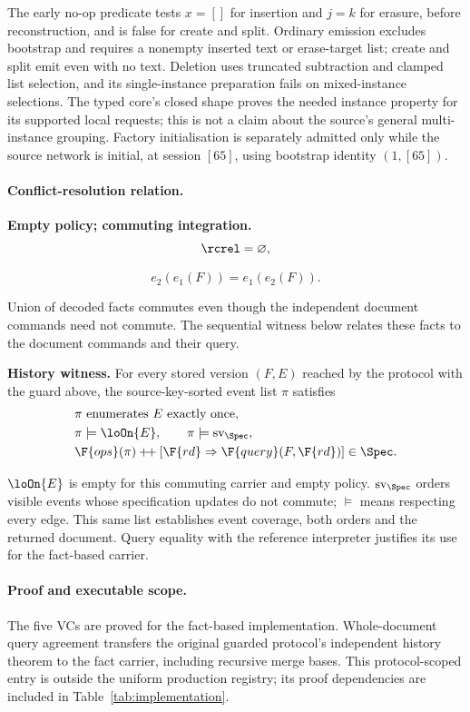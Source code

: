 The early no-op predicate tests $x=[]$ for insertion and $j=k$ for
erasure, before reconstruction, and is false for create and split.
Ordinary emission excludes bootstrap and requires a nonempty inserted
text or erase-target list; create and split emit even with no text.
Deletion uses truncated subtraction and clamped list selection, and its
single-instance preparation fails on mixed-instance selections. The typed
core's closed shape proves the needed instance property for its supported
local requests; this is not a claim about the source's general
multi-instance grouping. Factory initialisation is separately admitted
only while the source network is initial, at session $[65]$, using
bootstrap identity $(1,[65])$.

\paragraph{Conflict-resolution relation.}
\textbf{Empty policy; commuting integration.}
\[
\rcrel=\varnothing,
\]

\[
e_2(e_1(F))=e_1(e_2(F)).
\]

Union of decoded facts commutes even though the independent document commands
need not commute. The sequential witness below relates these facts to the
document commands and their query.

\textbf{History witness.} For every stored version $(F,E)$ reached by the
protocol with the guard above, the source-key-sorted event list $\pi$ satisfies
\[
\begin{aligned}
&\pi\text{ enumerates }E\text{ exactly once},\\
&\pi\models\loOn{E},\qquad\pi\models\operatorname{sv}_{\Spec},\\
&\F{ops}(\pi)\mathbin{+\!+}[\F{rd}\Rightarrow\F{query}(F,\F{rd})]\in\Spec.
\end{aligned}
\]

$\loOn{E}$ is empty for this commuting carrier and empty policy. $\operatorname{sv}_{\Spec}$ orders visible events whose specification updates do not commute; $\models$ means respecting every edge. This same list establishes event coverage, both orders and the returned
document. Query equality with the reference interpreter justifies its use
for the fact-based carrier.

\paragraph{Proof and executable scope.}
The five VCs are proved for the fact-based implementation. Whole-document query agreement
transfers the original guarded protocol's independent history theorem to the
fact carrier, including recursive merge bases. This protocol-scoped entry is
outside the uniform production registry; its proof dependencies are included
in Table~\ref{tab:implementation}.

